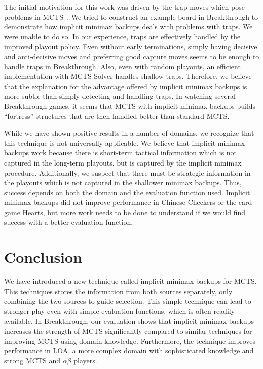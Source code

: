 \documentclass{article}
\begin{document}
The initial motivation for this work was driven by the trap moves which pose problems in 
MCTS~\cite{Ramanujan11Tradeoffs,Baier13MinimaxHybrids,Gudmindsson13Sufficiency}. We tried to construct an example board in Breakthrough 
to demonstrate how implicit minimax backups deals with problems with traps. We were unable to do so. In our experience, 
traps are effectively handled by the improved playout policy. Even without early terminations, 
simply having decisive and anti-decisive moves and preferring good capture moves seems to be enough to handle traps in Breakthrough.
Also, even with random playouts, an efficient implementation with MCTS-Solver handles shallow traps.
Therefore, we believe that the explanation for the advantage offered by implicit minimax backups is more subtle
than simply detecting and handling traps. In watching several Breakthrough games, it seems that MCTS with implicit minimax backups 
builds ``fortress'' structures \cite{Guid12Fortress} that are then handled better than standard MCTS.  

While we have shown positive results in a number of domains, we recognize that this 
technique is not universally applicable. We believe that implicit minimax backups work because there is short-term tactical 
information which 
is not captured in the long-term playouts, but is captured by the implicit minimax procedure. Additionally, we suspect that 
there must be strategic 
information in the playouts which is not captured in the shallower minimax backups. Thus, success depends on both the domain and 
the evaluation function used. Implicit minimax backups did not improve performance in Chinese Checkers or the card game Hearts, 
but more work needs to be done to understand if we would find success with a better evaluation function.

\section{Conclusion}

We have introduced a new technique called implicit minimax backups for MCTS. 
This techniques stores the information from both sources separately, only combining the
two sources to guide selection. This simple technique can lead to stronger play even with
simple evaluation functions, which is often readily available. 
In Breakthrough, our evaluation shows that implicit minimax backups increases 
the strength of MCTS significantly compared to similar techniques for improving MCTS
using domain knowledge. Furthermore, the technique improves 
performance in LOA, a more complex domain with sophisticated knowledge and 
strong MCTS and $\alpha \beta$ players. 
\end{document}
